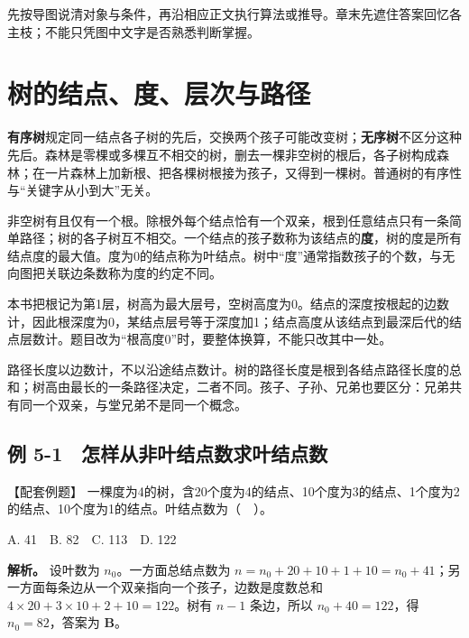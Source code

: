 先按导图说清对象与条件，再沿相应正文执行算法或推导。章末先遮住答案回忆各主枝；不能只凭图中文字是否熟悉判断掌握。

\section{树的结点、度、层次与路径}\label{DS05-01}

\begin{definition}[树及结点的度]

\textbf{有序树}规定同一结点各子树的先后，交换两个孩子可能改变树；\textbf{无序树}不区分这种先后。森林是零棵或多棵互不相交的树，删去一棵非空树的根后，各子树构成森林；在一片森林上加新根、把各棵树根接为孩子，又得到一棵树。普通树的有序性与``关键字从小到大''无关。

非空树有且仅有一个根。除根外每个结点恰有一个双亲，根到任意结点只有一条简单路径；树的各子树互不相交。一个结点的孩子数称为该结点的\textbf{度}，树的度是所有结点度的最大值。度为0的结点称为叶结点。树中``度''通常指数孩子的个数，与无向图把关联边条数称为度的约定不同。

\end{definition}

本书把根记为第1层，树高为最大层号，空树高度为0。结点的深度按根起的边数计，因此根深度为0，某结点层号等于深度加1；结点高度从该结点到最深后代的结点层数计。题目改为``根高度0''时，要整体换算，不能只改其中一处。

路径长度以边数计，不以沿途结点数计。树的路径长度是根到各结点路径长度的总和；树高由最长的一条路径决定，二者不同。孩子、子孙、兄弟也要区分：兄弟共有同一个双亲，与堂兄弟不是同一个概念。

\subsection{例 5-1　怎样从非叶结点数求叶结点数}\label{DS05-ex1}

\begin{example}[配套案例]

【配套例题】 一棵度为4的树，含20个度为4的结点、10个度为3的结点、1个度为2的结点、10个度为1的结点。叶结点数为（　）。

A. 41　B. 82　C. 113　D. 122

\end{example}

\textbf{解析。} 设叶数为 \(n_0\)。一方面总结点数为 \(n=n_0+20+10+1+10=n_0+41\)；另一方面每条边从一个双亲指向一个孩子，边数是度数总和 \(4\times20+3\times10+2+10=122\)。树有 \(n-1\) 条边，所以 \(n_0+40=122\)，得 \(n_0=82\)，答案为 \textbf{B}。

